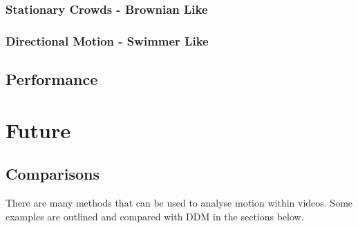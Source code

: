 \documentclass[11pt]{article}
\begin{document}
\subsubsection{Stationary Crowds - Brownian Like}

\subsubsection{Directional Motion - Swimmer Like}

\subsection{Performance}
\label{section:performance}

\clearpage
\section{Future}
\subsection{Comparisons}
There are many methods that can be used to analyse motion within videos. Some examples are outlined and compared with DDM in the sections below.
\end{document}
